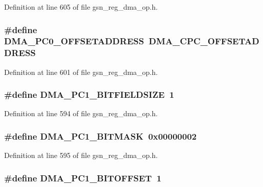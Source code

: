 Definition at line 605 of file gsn\_\-reg\_\-dma\_\-op.h.

\hypertarget{a00547_a92fb05b33dcfaa49dc3e177695413b2f}{
\subsubsection[{DMA\_\-PC0\_\-OFFSETADDRESS}]{\setlength{\rightskip}{0pt plus 5cm}\#define DMA\_\-PC0\_\-OFFSETADDRESS~DMA\_\-CPC\_\-OFFSETADDRESS}}
\label{a00547_a92fb05b33dcfaa49dc3e177695413b2f}


Definition at line 601 of file gsn\_\-reg\_\-dma\_\-op.h.

\hypertarget{a00547_adc953b9a63b8aea304f5fd3c5a5b37c1}{
\subsubsection[{DMA\_\-PC1\_\-BITFIELDSIZE}]{\setlength{\rightskip}{0pt plus 5cm}\#define DMA\_\-PC1\_\-BITFIELDSIZE~1}}
\label{a00547_adc953b9a63b8aea304f5fd3c5a5b37c1}


Definition at line 594 of file gsn\_\-reg\_\-dma\_\-op.h.

\hypertarget{a00547_a4aba948f4d1d8fbb5a006d0c6fd04f9c}{
\subsubsection[{DMA\_\-PC1\_\-BITMASK}]{\setlength{\rightskip}{0pt plus 5cm}\#define DMA\_\-PC1\_\-BITMASK~0x00000002}}
\label{a00547_a4aba948f4d1d8fbb5a006d0c6fd04f9c}


Definition at line 595 of file gsn\_\-reg\_\-dma\_\-op.h.

\hypertarget{a00547_ab5d5d1413dcb4e0e265b75527d54b991}{
\subsubsection[{DMA\_\-PC1\_\-BITOFFSET}]{\setlength{\rightskip}{0pt plus 5cm}\#define DMA\_\-PC1\_\-BITOFFSET~1}}
\label{a00547_ab5d5d1413dcb4e0e265b75527d54b991}


